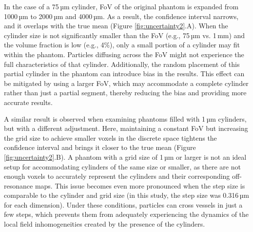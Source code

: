 In the case of a 75\,µm cylinder, FoV of the original phantom is expanded from 1000\,µm to 2000\,µm and 4000\,µm. As a result, the confidence interval narrows, and it overlaps with the true mean (Figure \ref{fig:uncertainty2}.A). When the cylinder size is not significantly smaller than the FoV (e.g., 75\,µm vs. 1\,mm) and the volume fraction is low (e.g., 4\%), only a small portion of a cylinder may fit within the phantom. Particles diffusing across the FoV might not experience the full characteristics of that cylinder. Additionally, the random placement of this partial cylinder in the phantom can introduce bias in the results. This effect can be mitigated by using a larger FoV, which may accommodate a complete cylinder rather than just a partial segment, thereby reducing the bias and providing more accurate results.

A similar result is observed when examining phantoms filled with 1\,µm cylinders, but with a different adjustment. Here, maintaining a constant FoV but increasing the grid size to achieve smaller voxels in the discrete space tightens the confidence interval and brings it closer to the true mean (Figure \ref{fig:uncertainty2}.B). A phantom with a grid size of 1\,µm or larger is not an ideal setup for accommodating cylinders of the same size or smaller, as there are not enough voxels to accurately represent the cylinders and their corresponding off-resonance maps. This issue becomes even more pronounced when the step size is comparable to the cylinder and grid size (in this study, the step size was 0.316\,µm for each dimension). Under these conditions, particles can cross vessels in just a few steps, which prevents them from adequately experiencing the dynamics of the local field inhomogeneities created by the presence of the cylinders.

